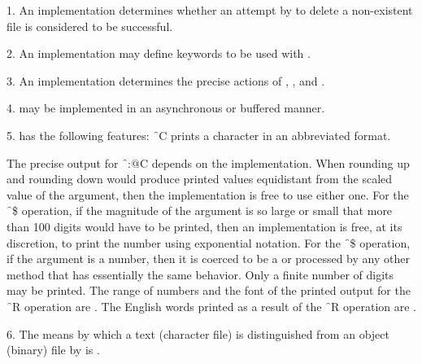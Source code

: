 
\endlist
\endsubSection%


\beginlist

\item{1.} An implementation determines whether an attempt by 
 to delete a non-existent file is considered to be successful.

\item{2.} An implementation may define keywords to be used with
.

\item{3.} An implementation determines the precise actions of
, , and
. 

\item{4.}  
may be implemented in an asynchronous or buffered manner.

\item{5.}  has the following 
features:
\beginlist
 \f{~C} prints a character in an 
abbreviated format.  

 The precise output for \f{~:@C} depends 
on the implementation.
 When rounding up and rounding down would produce printed values
equidistant from the scaled value of the argument, then the implementation
is free to use either one.  
 For the \f{~\$} operation, if the magnitude of the argument is so large or small 
that more than 100 digits would have to
be printed, then an implementation is free, at its discretion, to print
the number using exponential notation.
 For the \f{~\$} operation, if 
the argument is a  number, 
then it is coerced to be a 
or processed by any other method that has essentially the
same behavior. 
Only a finite number of digits may be printed.
 The range of numbers and the font of the printed output
for the \f{~R} operation are . 
The English words printed as a result of the \f{~R} operation are
. 
\endlist
\item{6.} The means by which a text (character file) 
is distinguished from an object (binary) file by  is
. 


